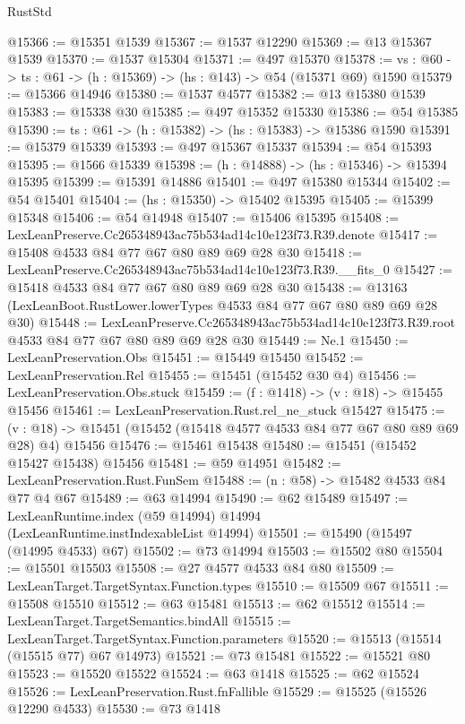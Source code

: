 \begin{lexlean}{RustStd}
\begin{coremodule}
@15366 := @15351 @1539
@15367 := @1537 @12290
@15369 := @13 @15367 @1539
@15370 := @1537 @15304
@15371 := @497 @15370
@15378 := {vs : @60} -> {ts : @61} -> (h : @15369) -> (hs : @143) -> @54 (@15371 @69) @1590
@15379 := @15366 @14946
@15380 := @1537 @4577
@15382 := @13 @15380 @1539
@15383 := @15338 @30
@15385 := @497 @15352 @15330
@15386 := @54 @15385
@15390 := {ts : @61} -> (h : @15382) -> (hs : @15383) -> @15386 @1590
@15391 := @15379 @15339
@15393 := @497 @15367 @15337
@15394 := @54 @15393
@15395 := @1566 @15339
@15398 := (h : @14888) -> (hs : @15346) -> @15394 @15395
@15399 := @15391 @14886
@15401 := @497 @15380 @15344
@15402 := @54 @15401
@15404 := (hs : @15350) -> @15402 @15395
@15405 := @15399 @15348
@15406 := @54 @14948
@15407 := @15406 @15395
@15408 := LexLeanPreserve.Cc265348943ac75b534ad14c10e123f73.R39.denote
@15417 := @15408 @4533 @84 @77 @67 @80 @89 @69 @28 @30
@15418 := LexLeanPreserve.Cc265348943ac75b534ad14c10e123f73.R39.__fits_0
@15427 := @15418 @4533 @84 @77 @67 @80 @89 @69 @28 @30
@15438 := @13163 (LexLeanBoot.RustLower.lowerTypes @4533 @84 @77 @67 @80 @89 @69 @28 @30)
@15448 := LexLeanPreserve.Cc265348943ac75b534ad14c10e123f73.R39.root
    @4533
    @84
    @77
    @67
    @80
    @89
    @69
    @28
    @30
@15449 := Ne.{1}
@15450 := LexLeanPreservation.Obs
@15451 := @15449 @15450
@15452 := LexLeanPreservation.Rel
@15455 := @15451 (@15452 @30 @4)
@15456 := LexLeanPreservation.Obs.stuck
@15459 := (f : @1418) -> (v : @18) -> @15455 @15456
@15461 := LexLeanPreservation.Rust.rel_ne_stuck @15427
@15475 := (v : @18) -> @15451 (@15452 (@15418 @4577 @4533 @84 @77 @67 @80 @89 @69 @28) @4) @15456
@15476 := @15461 @15438
@15480 := @15451 (@15452 @15427 @15438) @15456
@15481 := @59 @14951
@15482 := LexLeanPreservation.Rust.FunSem
@15488 := (n : @58) -> @15482 @4533 @84 @77 @4 @67
@15489 := @63 @14994
@15490 := @62 @15489
@15497 := LexLeanRuntime.index (@59 @14994) @14994 (LexLeanRuntime.instIndexableList @14994)
@15501 := @15490 (@15497 (@14995 @4533) @67)
@15502 := @73 @14994
@15503 := @15502 @80
@15504 := @15501 @15503
@15508 := @27 @4577 @4533 @84 @80
@15509 := LexLeanTarget.TargetSyntax.Function.types
@15510 := @15509 @67
@15511 := @15508 @15510
@15512 := @63 @15481
@15513 := @62 @15512
@15514 := LexLeanTarget.TargetSemantics.bindAll
@15515 := LexLeanTarget.TargetSyntax.Function.parameters
@15520 := @15513 (@15514 (@15515 @77) @67 @14973)
@15521 := @73 @15481
@15522 := @15521 @80
@15523 := @15520 @15522
@15524 := @63 @1418
@15525 := @62 @15524
@15526 := LexLeanPreservation.Rust.fnFallible
@15529 := @15525 (@15526 @12290 @4533)
@15530 := @73 @1418

\end{coremodule}
\end{lexlean}
